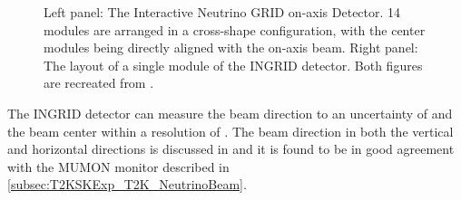 \begin{figure}[h]
\begin{subfigure}[t]{0.55\textwidth}
  \end{subfigure}%
  \caption{Left panel: The Interactive Neutrino GRID on-axis Detector. 14 modules are arranged in a cross-shape configuration, with the center modules being directly aligned with the on-axis beam. Right panel: The layout of a single module of the INGRID detector. Both figures are recreated from \cite{t2k_det}.}
  \label{fig:T2KSKExp_T2K_INGRID}
\end{figure}

The INGRID detector can measure the beam direction to an uncertainty of  and the beam center within a resolution of  \cite{t2k_det}. The beam direction in both the vertical and horizontal directions is discussed in \cite{Suzuki_2015} and it is found to be in good agreement with the MUMON monitor described in \autoref{subsec:T2KSKExp_T2K_NeutrinoBeam}.
